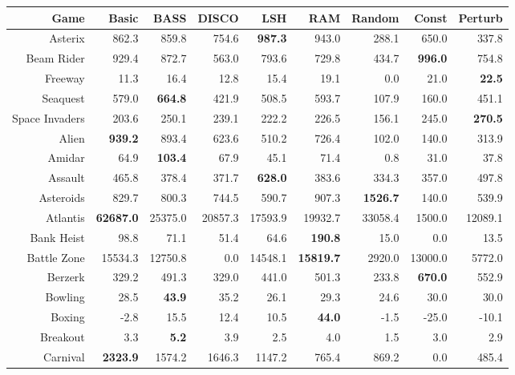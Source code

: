 \documentclass[twoside,11pt]{article}
\newcommand{\gamename}[1]{{\sc #1}}
\begin{document}
\begin{table}[h!]
\tiny
\begin{center}
\clearpage{}\begin{tabular}{|r|r|r|r|r|r||r|r|r|}
\hline
Game & Basic & BASS & DISCO & LSH & RAM & Random & Const & Perturb \\
\hline
\hline
\gamename{Asterix} & 862.3& 859.8& 754.6& \textbf { 987.3 }& 943.0& 288.1& 650.0& 337.8\\
\hline
\gamename{Beam Rider} & 929.4& 872.7& 563.0& 793.6& 729.8& 434.7& \textbf { 996.0 }& 754.8\\
\hline
\gamename{Freeway} & 11.3& 16.4& 12.8& 15.4& 19.1& 0.0 & 21.0& \textbf { 22.5 }\\
\hline
\gamename{Seaquest} & 579.0& \textbf { 664.8 }& 421.9& 508.5& 593.7& 107.9& 160.0& 451.1\\
\hline
\gamename{Space Invaders} & 203.6& 250.1& 239.1& 222.2& 226.5& 156.1& 245.0& \textbf { 270.5 }\\
\hline
\hline
\gamename{Alien} & \textbf { 939.2 }& 893.4& 623.6& 510.2& 726.4& 102.0& 140.0& 313.9\\
\hline
\gamename{Amidar} & 64.9& \textbf { 103.4 }& 67.9& 45.1& 71.4& 0.8& 31.0& 37.8\\
\hline
\gamename{Assault} & 465.8& 378.4& 371.7& \textbf { 628.0 }& 383.6& 334.3& 357.0& 497.8\\
\hline
\gamename{Asteroids} & 829.7& 800.3& 744.5& 590.7& 907.3& \textbf { 1526.7 }& 140.0& 539.9\\
\hline
\gamename{Atlantis} & \textbf { 62687.0 }& 25375.0& 20857.3& 17593.9& 19932.7& 33058.4& 1500.0& 12089.1\\
\hline
\gamename{Bank Heist} & 98.8& 71.1& 51.4& 64.6& \textbf { 190.8 }& 15.0& 0.0& 13.5\\
\hline
\gamename{Battle Zone} & 15534.3& 12750.8& 0.0& 14548.1& \textbf { 15819.7 }& 2920.0& 13000.0& 5772.0\\
\hline
\gamename{Berzerk} & 329.2& 491.3& 329.0& 441.0& 501.3& 233.8& \textbf { 670.0 }& 552.9\\
\hline
\gamename{Bowling} & 28.5& \textbf { 43.9 }& 35.2& 26.1& 29.3& 24.6& 30.0& 30.0\\
\hline
\gamename{Boxing} & -2.8& 15.5& 12.4& 10.5& \textbf { 44.0 }& -1.5& -25.0& -10.1\\
\hline
\gamename{Breakout} & 3.3& \textbf { 5.2 }& 3.9& 2.5& 4.0& 1.5& 3.0& 2.9\\
\hline
\gamename{Carnival} & \textbf { 2323.9 }& 1574.2& 1646.3& 1147.2& 765.4& 869.2& 0.0& 485.4\\

\end{tabular}
\end{center}
\end{table}
\end{document}
